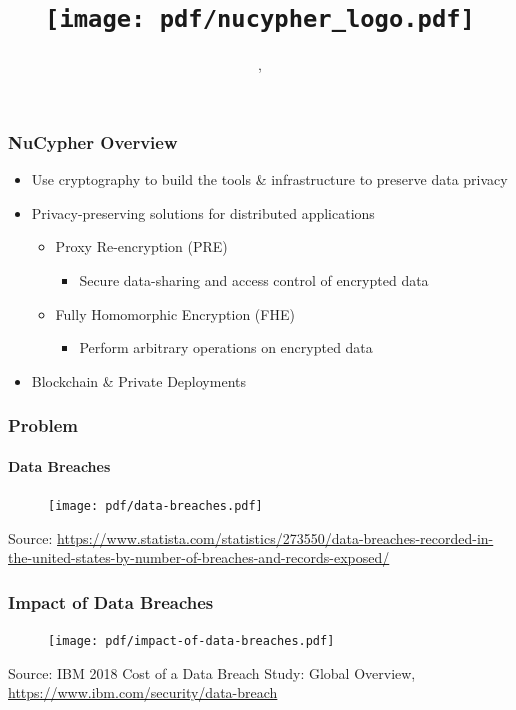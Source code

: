 \documentclass[xetex,mathsans,sans,aspectratio=169]{beamer}
\title[\titlefooter]{\texttt{[image: pdf/nucypher\_logo.pdf]}}
\author[\presenterfooter]{\presenter}
\date[\eventdate]{\event, \eventdate}
\begin{document}
    \begin{frame}
        \titlepage
    \end{frame}

    \begin{frame}
      \frametitle{NuCypher Overview}
        \begin{itemize}
            \item Use cryptography to build the tools \& infrastructure to preserve data privacy
            \item Privacy-preserving solutions for distributed applications
              \begin{itemize}
                  \item Proxy Re-encryption (PRE)
                  \begin{itemize}
                    \item Secure data-sharing and access control of encrypted data
                  \end{itemize}
                  \item Fully Homomorphic Encryption (FHE)
                  \begin{itemize}
                    \item Perform arbitrary operations on encrypted data
                  \end{itemize}
              \end{itemize}
            \item Blockchain \& Private Deployments
        \end{itemize}
    \end{frame}

    \begin{frame}
      \frametitle{Problem}
      \framesubtitle{Data Breaches}
        \begin{figure}
            \centering
            \texttt{[image: pdf/data-breaches.pdf]}
        \end{figure}

        {\tiny Source: \url{https://www.statista.com/statistics/273550/data-breaches-recorded-in-the-united-states-by-number-of-breaches-and-records-exposed/} \par}
    \end{frame}

    \begin{frame}
      \frametitle{Impact of Data Breaches}
        \begin{figure}
            \centering
            \texttt{[image: pdf/impact-of-data-breaches.pdf]}
        \end{figure}

        {\tiny Source: IBM 2018 Cost of a Data Breach Study: Global Overview, \url{https://www.ibm.com/security/data-breach} \par}
    \end{frame}
\end{document}
